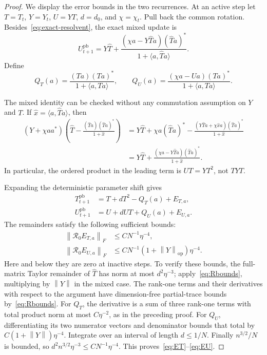 \documentclass[10pt,a4paper]{amsart}
\newcommand{\R}{\mathcal R}
\newcommand{\ip}[2]{\langle#1,#2\rangle}
\newcommand{\norm}[1]{\left\lVert#1\right\rVert}
\newcommand{\op}{\mathrm{op}}
\begin{document}
\begin{proof}
We display the error bounds in the two recurrences. At an active step let $T=T_t$, $Y=Y_t$, $U=YT$, $d=d_0$, and $\chi=\chi_t$. Pull back the common rotation. Besides~\eqref{eq:exact-resolvent}, the exact mixed update is
\begin{equation}\label{eq:mixed-exact}
 U_{t+1}^{\mathrm{pb}}
 =Y\widehat T+
   \frac{(\chi a-Y\widehat T a)(\widehat T a)^*}
        {1+\ip a{\widehat T a}}.
\end{equation}
Define
\[
 Q_T(a)=\frac{(Ta)(Ta)^*}{1+\ip a{Ta}},\qquad
 Q_U(a)=\frac{(\chi a-Ua)(Ta)^*}{1+\ip a{Ta}}.
\]

The mixed identity can be checked without any commutation assumption on $Y$ and $T$. If $\widehat x=\langle a,\widehat Ta\rangle$, then
\begin{align*}
 (Y+\chi aa^*)\left(\widehat T-
 \frac{(\widehat Ta)(\widehat Ta)^*}{1+\widehat x}\right)
 &=Y\widehat T+\chi a(\widehat Ta)^*
   -\frac{(Y\widehat Ta+\chi\widehat x a)(\widehat Ta)^*}{1+\widehat x}\\
 &=Y\widehat T+
   \frac{(\chi a-Y\widehat Ta)(\widehat Ta)^*}{1+\widehat x}.
\end{align*}
In particular, the ordered product in the leading term is $UT=YT^2$, not $TYT$.

Expanding the deterministic parameter shift gives
\begin{align}
 T_{t+1}^{\mathrm{pb}}&=T+dT^2-Q_T(a)+E_{T,a},\label{eq:Texp}\\
 U_{t+1}^{\mathrm{pb}}&=U+dUT+Q_U(a)+E_{U,a}.\label{eq:Uexp}
\end{align}
The remainders satisfy the following sufficient bounds:
\begin{align}
 \norm{\R_0E_{T,a}}_F&\le C N^{-1}\eta^{-4},\label{eq:ET}\\
 \norm{\R_0E_{U,a}}_F&\le C N^{-1}(1+\norm Y_{\op})\eta^{-4}.
 \label{eq:EU}
\end{align}
Here and below they are zero at inactive steps. To verify these bounds, the full-matrix Taylor remainder of $\widehat T$ has norm at most $d^2\eta^{-3}$; apply~\eqref{eq:Rbounds}, multiplying by $\norm Y$ in the mixed case. The rank-one terms and their derivatives with respect to the argument have dimension-free partial-trace bounds by~\eqref{eq:Rbounds}. For $Q_T$, the derivative is a sum of three rank-one terms with total product norm at most $C\eta^{-2}$, as in the preceding proof. For $Q_U$, differentiating its two numerator vectors and denominator bounds that total by $C(1+\norm Y)\eta^{-4}$. Integrate over an interval of length $d\le1/N$. Finally $n^{3/2}/N$ is bounded, so $d^2 n^{3/2}\eta^{-3}\le C N^{-1}\eta^{-4}$. This proves~\eqref{eq:ET}--\eqref{eq:EU}.


\end{proof}
\end{document}
